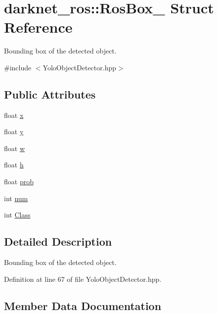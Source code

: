 \hypertarget{structdarknet__ros_1_1RosBox__}{}\section{darknet\+\_\+ros\+::Ros\+Box\+\_\+ Struct Reference}
\label{structdarknet__ros_1_1RosBox__}


Bounding box of the detected object.  




{\ttfamily \#include $<$Yolo\+Object\+Detector.\+hpp$>$}

\subsection*{Public Attributes}
\begin{DoxyCompactItemize}
\item 
float \mbox{\hyperlink{structdarknet__ros_1_1RosBox___a779bfc5f14e363b8eb59cc10de081e81}{x}}
\item 
float \mbox{\hyperlink{structdarknet__ros_1_1RosBox___a3a9fbd56994bf5fa7959806b392d1bd9}{y}}
\item 
float \mbox{\hyperlink{structdarknet__ros_1_1RosBox___aaa6ba65715e618e2e35f2a880be791dc}{w}}
\item 
float \mbox{\hyperlink{structdarknet__ros_1_1RosBox___ab45fb51f3bad36fe0a0b4ff9da147db1}{h}}
\item 
float \mbox{\hyperlink{structdarknet__ros_1_1RosBox___af6b75d5d9a851b3efb5aeb8ea86cf8ee}{prob}}
\item 
int \mbox{\hyperlink{structdarknet__ros_1_1RosBox___a340216f7b02139bf7ea909a54be99431}{num}}
\item 
int \mbox{\hyperlink{structdarknet__ros_1_1RosBox___a1cd108a96b2d94ba4e7292adf83cdee7}{Class}}
\end{DoxyCompactItemize}


\subsection{Detailed Description}
Bounding box of the detected object. 

Definition at line 67 of file Yolo\+Object\+Detector.\+hpp.



\subsection{Member Data Documentation}
\mbox{\label{structdarknet__ros_1_1RosBox___a1cd108a96b2d94ba4e7292adf83cdee7}} 
